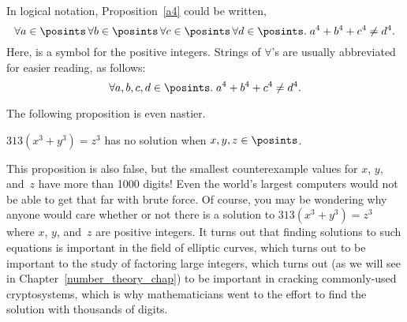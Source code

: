 In logical notation, Proposition~\ref{a4} could be written,
\[
\forall a \in \posints\, \forall b \in \posints\, \forall c \in \posints\, \forall
d \in \posints.\; a^4 + b^4 + c^4 \neq d^4.
\]
Here, \term{$\posints$} is a symbol for the positive integers.
Strings of $\forall$'s are usually abbreviated for easier reading, as
follows:
\[
\forall a, b, c, d \in \posints.\; a^4 + b^4 + c^4 \neq d^4.
\]

The following proposition is even nastier.
\begin{proposition}
$313 (x^3 + y^3) = z^3$ has no solution when $x, y, z\in\posints$.
\end{proposition}

This proposition is also false, but the smallest counterexample values
for $x$, $y$, and~$z$ have more than 1000 digits!  Even the world's
largest computers would not be able to get that far with brute force.
Of course, you may be wondering why anyone would care whether or not
there is a solution to $313 (x^3 + y^3) = z^3$ where $x$, $y$, and~$z$
are positive integers.  It turns out that finding solutions to such
equations is important in the field of elliptic curves, which turns
out to be important to the study of factoring large integers, which
turns out (as we will see in Chapter~\ref{number_theory_chap}) to be
important in cracking commonly-used cryptosystems, which is why
mathematicians went to the effort to find the solution with thousands
of digits.  


